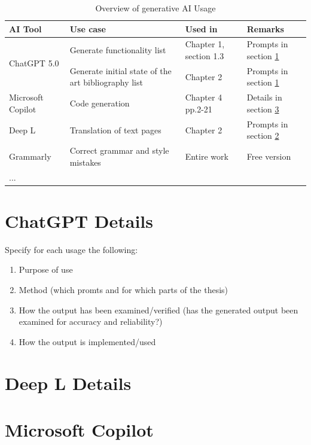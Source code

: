 \documentclass[12pt,a4paper]{book}
\theoremstyle{definition}
\theoremstyle{remark}
\begin{document}
\begin{table}[h!]
    \centering
    \begin{tabularx}{\textwidth}{|l|X|X|X|}
            \hline \rowcolor{blue!20}
         AI Tool& Use case & Used in & Remarks \\\hline
         \multirow{2}{*}{ChatGPT 5.0} & Generate functionality list & Chapter 1, section 1.3& Prompts in section \ref{sectionGhatGPT}\\ \cline{2-4}
          
          & Generate initial state of the art bibliography list & Chapter 2 & Prompts in section \ref{sectionGhatGPT}\\ \hline
         
         Microsoft Copilot & Code generation & Chapter 4 pp.2-21  & Details in section \ref{sectionCopilot}\\ \hline
         Deep L &  Translation of text pages & Chapter 2 & Prompts in section \ref{sectionDeepL} \\ \hline
         Grammarly & Correct grammar and style mistakes & Entire work & Free version\\ \hline
         ... &  & & \\\hline
    \end{tabularx}
    \caption{Overview of generative AI Usage}
    \label{tab:genAIOverview}
\end{table}




    
\section{ChatGPT Details} 
\label{sectionGhatGPT}

Specify for each usage the following:

\begin{enumerate}
    \item Purpose of use
    \item Method (which promts and for which parts of the thesis)
    \item How the output has been examined/verified (has the generated output been examined for accuracy and reliability?)
    \item How the output is implemented/used
\end{enumerate}

\section{Deep L Details}
\label{sectionDeepL}
\section{Microsoft Copilot}
\label{sectionCopilot}
\end{document}
